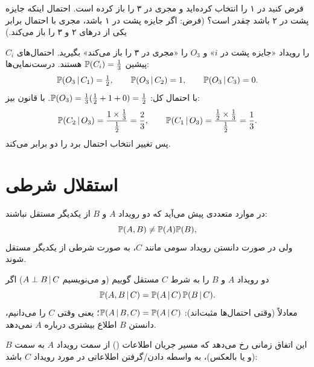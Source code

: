 \begin{example}
فرض کنید در ۱ را انتخاب کرده‌اید و مجری در ۳ را باز کرده است. احتمال اینکه جایزه پشت در ۲ باشد چقدر است؟ (فرض: اگر جایزه پشت در ۱ باشد، مجری با احتمال برابر یکی از درهای ۲ و ۳ را باز می‌کند.)
\begin{solution}
$C_i$ را رویداد «جایزه پشت در $i$» و $O_3$ را «مجری در ۳ را باز می‌کند» بگیرید. احتمال‌های پیشین $\mathbb{P}(C_i)=\frac13$ هستند. درست‌نمایی‌ها:
\[
\mathbb{P}(O_3\,|\, C_1)=\tfrac12,\qquad \mathbb{P}(O_3\,|\, C_2)=1,\qquad \mathbb{P}(O_3\,|\, C_3)=0 .
\]
با احتمال کل: $\mathbb{P}(O_3)=\frac13(\frac12+1+0)=\frac12$. با قانون بیز:
\[
\mathbb{P}(C_2\,|\, O_3)=\frac{1\times\frac13}{\frac12}=\frac23,\qquad \mathbb{P}(C_1\,|\, O_3)=\frac{\frac12\times\frac13}{\frac12}=\frac13 .
\]
پس تغییر انتخاب احتمال برد را دو برابر می‌کند.
\end{solution}
\end{example}

\section{استقلال شرطی }

در موارد متعددی پیش می‌آید که دو رویداد $A$ و $B$ از یکدیگر مستقل نباشند:
\[
\mathbb{P}(A,B)\neq\mathbb{P}(A)\mathbb{P}(B),
\]
ولی در صورت دانستن رویداد سومی مانند $C$، به صورت شرطی از یکدیگر مستقل شوند.

\begin{definition}
دو رویداد $A$ و $B$ را به شرط $C$ مستقل گوییم (و می‌نویسیم $A\perp B\,|\, C$) اگر
\[
\mathbb{P}(A,B\,|\, C)=\mathbb{P}(A\,|\, C)\,\mathbb{P}(B\,|\, C).
\]
معادلاً (وقتی احتمال‌ها مثبت‌اند): $\mathbb{P}(A\,|\, B,C)=\mathbb{P}(A\,|\, C)$؛ یعنی وقتی $C$ را می‌دانیم، دانستن $B$ اطلاع بیشتری درباره $A$ نمی‌دهد.
\end{definition}

این اتفاق زمانی رخ می‌دهد که مسیر جریان اطلاعات () از سمت رویداد $A$ به سمت $B$ (و یا بالعکس)، به واسطه دادن/گرفتن اطلاعاتی در مورد رویداد $C$ باشد:

\begin{center}
\end{center}

